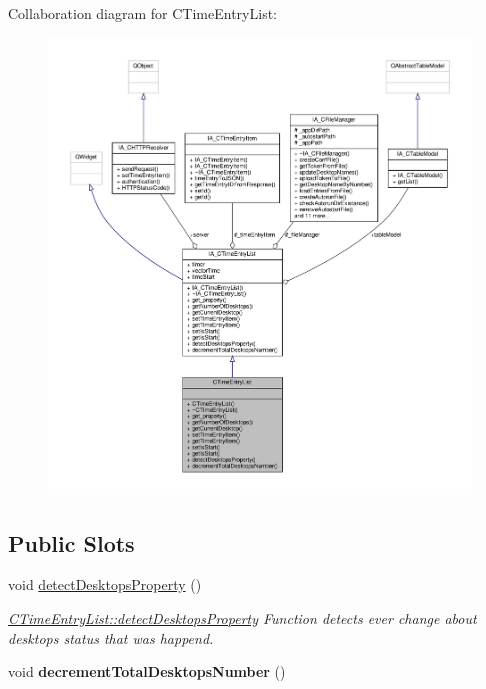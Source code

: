 Collaboration diagram for C\+Time\+Entry\+List\+:
\nopagebreak
\begin{figure}[H]
\begin{center}
\leavevmode
\includegraphics[width=350pt]{classCTimeEntryList__coll__graph}
\end{center}
\end{figure}
\subsection*{Public Slots}
\begin{DoxyCompactItemize}
\item 
\mbox{\label{classCTimeEntryList_a8c3e063ec914cac771958a23fc0055a5}} 
void \hyperlink{classCTimeEntryList_a8c3e063ec914cac771958a23fc0055a5}{detect\+Desktops\+Property} ()
\begin{DoxyCompactList}\small\item\em \hyperlink{classCTimeEntryList_a8c3e063ec914cac771958a23fc0055a5}{C\+Time\+Entry\+List\+::detect\+Desktops\+Property} Function detects ever change about desktops status that was happend. \end{DoxyCompactList}\item 
\mbox{\label{classCTimeEntryList_a63519d98ac71bb570a67c459c666dd65}} 
void {\bfseries decrement\+Total\+Desktops\+Number} ()
\end{DoxyCompactItemize}
